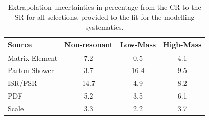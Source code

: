 \begin{table}
\centering
\begin{tabular}{l|ccc}
\hline
Source               & Non-resonant 	&  Low-Mass   		& 		High-Mass   \\\hline\hline 
Matrix Element       & 7.2 			&    0.5                	 &           	4.1                 \\\hline
Parton Shower        & 3.7 			&   16.4                     &              9.5                 \\\hline
ISR/FSR              & 14.7 			&  4.9       			 &             8.2                 \\\hline
PDF                  & 5.2 			&  3.5 			&           6.1                 \\\hline
Scale                & 3.3 			& 2.2                		&               3.7                 \\\hline\hline

\end{tabular}
\caption[Extrapolation uncertainties]{Extrapolation uncertainties in percentage from the CR to the SR for all selections,  provided to the fit for the \ttbar modelling systematics.}
\label{tab:ttbarModeling}
\end{table}

